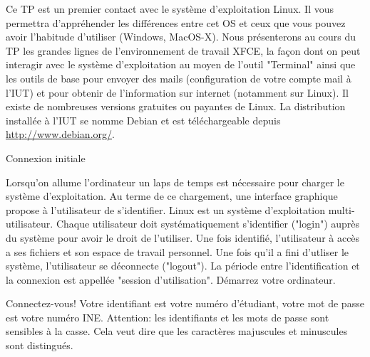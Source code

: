 \begin{exercice}
  Ce TP est un premier contact avec le système d'exploitation Linux. Il
  vous permettra d'appréhender les différences entre cet OS et ceux que
  vous pouvez avoir l'habitude d'utiliser (Windows, MacOS-X). Nous
  présenterons au cours du TP les grandes lignes de l'environnement de
  travail XFCE, la façon dont on peut interagir avec le système
  d'exploitation au moyen de l'outil "Terminal" ainsi que les outils de
  base pour envoyer des mails (configuration de votre compte mail à
  l'IUT) et pour obtenir de l'information sur internet (notamment sur
  Linux). Il existe de nombreuses versions gratuites ou payantes de
  Linux. La distribution installée à l'IUT se nomme Debian et est
  téléchargeable depuis \url{http://www.debian.org/}.
  \begin{exercicelet}{Connexion initiale}
    \begin{questions}
    \item Lorsqu'on allume l'ordinateur un laps de temps est nécessaire
      pour charger le système d'exploitation. Au terme de ce chargement,
      une interface graphique propose à l'utilisateur de s'identifier.
      Linux est un système d'exploitation multi-utilisateur. Chaque
      utilisateur doit systématiquement s'identifier ("login") auprès du
      système pour avoir le droit de l'utiliser. Une fois identifié,
      l'utilisateur à accès a ses fichiers et son espace de travail
      personnel. Une fois qu'il a fini d'utliser le système,
      l'utilisateur se déconnecte ("logout"). La période entre
      l'identification et la connexion est appellée "session
      d'utilisation". Démarrez votre ordinateur.
    \item Connectez-vous! Votre identifiant est votre numéro d'étudiant,
      votre mot de passe est votre numéro INE.  Attention: les
      identifiants et les mots de passe sont sensibles à la casse. Cela
      veut dire que les caractères majuscules et minuscules sont
      distingués.
    \end{questions}
  \end{exercicelet}
\end{exercice}


